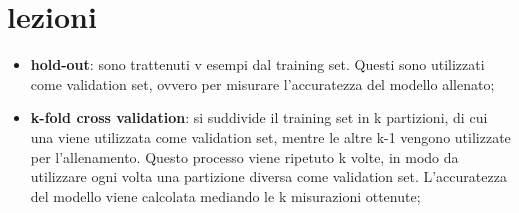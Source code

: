 \documentclass{article}
\begin{document}
\section{lezioni}
\begin{itemize}
\item \textbf{hold-out}: sono trattenuti v esempi dal training set. Questi sono
	utilizzati come validation set, ovvero per misurare l'accuratezza del
	modello allenato;
	
\item \textbf{k-fold cross validation}: si suddivide il training set in k
	partizioni, di cui una viene utilizzata come validation set, mentre le
	altre k-1 vengono utilizzate per l'allenamento. Questo processo viene
	ripetuto k volte, in modo da utilizzare ogni volta una partizione
	diversa come validation set. L'accuratezza del modello viene calcolata
	mediando le k misurazioni ottenute;
\end{itemize}
\end{document}
